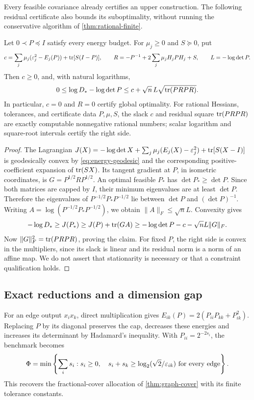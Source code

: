 Every feasible covariance already certifies an upper construction.
The following residual certificate also bounds its suboptimality,
without running the conservative algorithm of \cref{thm:rational-finite}.
\begin{proposition}\label{prop:covariance-certificate}
Let $0\prec P\preceq I$ satisfy every energy budget. For $\mu_j\ge0$
and $S\succeq0$, put
\[
 c=\sum_j\mu_j(\varepsilon_j^2-E_j(P))+\operatorname{tr}[S(I-P)],\qquad
 R=-P^{-1}+2\sum_j\mu_jH_jPH_j+S,\qquad L=-\log\det P.
\]
Then $c\ge0$, and, with natural logarithms,
\begin{equation}\label{eq:covariance-certificate}
 0\le\log D_* -\log\det P
 \le c+\sqrt n\,L\sqrt{\operatorname{tr}(PRPR)}.
\end{equation}
In particular, $c=0$ and $R=0$ certify global optimality. For rational
Hessians, tolerances, and certificate data $P,\mu,S$, the slack $c$ and
residual square $\operatorname{tr}(PRPR)$ are exactly computable nonnegative rational
numbers; scalar logarithm and square-root intervals certify the right side.
\end{proposition}
\begin{proof}
The Lagrangian
$J(X)=-\log\det X+\sum_j\mu_j(E_j(X)-\varepsilon_j^2)+\operatorname{tr}[S(X-I)]$
is geodesically convex by \eqref{eq:energy-geodesic} and the corresponding
positive-coefficient expansion of $\operatorname{tr}(SX)$. Its tangent gradient at $P$,
in isometric coordinates, is $G=P^{1/2}RP^{1/2}$. An optimal feasible
$P_*$ has $\det P_*\ge\det P$. Since both matrices are capped by $I$,
their minimum eigenvalues are at least $\det P$. Therefore the eigenvalues
of $P^{-1/2}P_*P^{-1/2}$ lie between $\det P$ and $(\det P)^{-1}$.
Writing $A=\log(P^{-1/2}P_*P^{-1/2})$, we obtain
$\|A\|_F\le\sqrt nL$. Convexity gives
\[
 -\log D_*\ge J(P_*)\ge J(P)+\operatorname{tr}(GA)
 \ge-\log\det P-c-\sqrt nL\|G\|_F.
\]
Now $\|G\|_F^2=\operatorname{tr}(PRPR)$, proving the claim. For fixed $P$, the
right side is convex in the multipliers, since its slack is linear and
its residual norm is a norm of an affine map. We do not assert that
stationarity is necessary or that a constraint qualification holds.
\end{proof}

\subsection{Exact reductions and a dimension gap}

For an edge output $x_ix_k$, direct multiplication gives
$E_{ik}(P)=2(P_{ii}P_{kk}+P_{ik}^2)$. Replacing $P$ by its diagonal
preserves the cap, decreases these energies and increases its determinant
by Hadamard's inequality. With $P_{ii}=2^{-2s_i}$, the benchmark becomes
\begin{equation}\label{eq:covariance-graph-lp}
 \Phi=\min\left\{\sum_i s_i:s_i\ge0,\quad
 s_i+s_k\ge\log_2(\sqrt2/\varepsilon_{ik})\text{ for every edge}\right\}.
\end{equation}
This recovers the fractional-cover allocation of \cref{thm:graph-cover}
with its finite tolerance constants.

